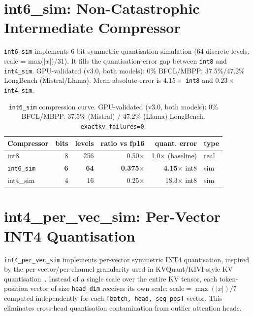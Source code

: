\documentclass[11pt]{article}
\begin{document}
\section{int6\_sim: Non-Catastrophic Intermediate Compressor}
\label{sec:int6}

\begin{sloppypar}
\texttt{int6\_sim} implements 6-bit symmetric quantisation simulation
(64 discrete levels, scale = max($|x|$)/31). It fills the quantisation-error gap
between \texttt{int8} and \texttt{int4\_sim}. GPU-validated (v3.0, both models):
0\% BFCL/MBPP; 37.5\%/47.2\% LongBench (Mistral/Llama). Mean absolute error is
$4.15\times$ \texttt{int8} and $0.23\times$ \texttt{int4\_sim}.
\end{sloppypar}
\begin{table}[htbp]
\centering\small\setlength\tabcolsep{4pt}
\begin{tabular}{lrrrrl}
\toprule
\textbf{Compressor} & \textbf{bits} & \textbf{levels} & \textbf{ratio vs fp16} & \textbf{quant. error} & \textbf{type} \\
\midrule
int8      & 8 & 256 & 0.50$\times$ & 1.0$\times$ (baseline) & real \\
\texttt{int6\_sim} & \textbf{6} & \textbf{64} & \textbf{0.375}$\times$ & \textbf{4.15}$\times$ int8 & sim \\
int4\_sim & 4 & 16  & 0.25$\times$ & 18.3$\times$ int8 & sim \\
\bottomrule
\end{tabular}
\caption{\texttt{int6\_sim} compression curve. GPU-validated (v3.0, both models):
0\% BFCL/MBPP. 37.5\% (Mistral) / 47.2\% (Llama) LongBench. \texttt{exactkv\_failures=0}.}
\label{tab:int6-curve}
\end{table}

\section{int4\_per\_vec\_sim: Per-Vector INT4 Quantisation}
\label{sec:int4pervec}

\texttt{int4\_per\_vec\_sim} implements per-vector symmetric INT4 quantisation, inspired by the
per-vector/per-channel granularity used in KVQuant/KIVI-style KV quantisation~\citep{hooper2024kvquant,liu2024kivi}.
Instead of a single scale over the entire KV tensor, each token-position vector of size
\texttt{head\_dim} receives its own scale: $\text{scale} = \max(|x|) / 7$ computed
independently for each \texttt{[batch, head, seq\_pos]} vector. This eliminates cross-head
quantisation contamination from outlier attention heads.
\end{document}
